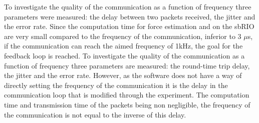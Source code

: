{\color{green}
To investigate the quality of the communication as a function of frequency three parameters were measured: the delay between two packets received, the jitter and the error rate. Since the computation time for force estimation and on the sbRIO are very small compared to the frequency of the communication, inferior to 3 $\mu$s, if the communication can reach the aimed frequency of 1kHz, the goal for the feedback loop is reached.
}
{\color{red}
To investigate the quality of the communication as a function of frequency three parameters are measured: the round-time trip delay, the jitter and the error rate. However, as the software does not have a way of directly setting the frequency of the communication it is the delay in the communication loop that is modified through the experiment. The computation time and transmission time of the packets being non negligible, the frequency of the communication is not equal to the inverse of this delay.
}
